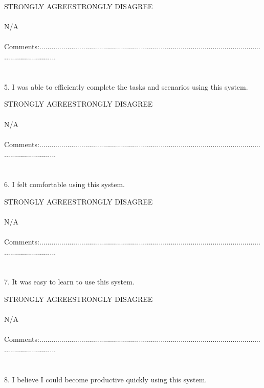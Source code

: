 \begin{appendix}
{STRONGLY AGREE\tab\tab\tab\tab\tab STRONGLY DISAGREE\\
\\
\tab\tab N/A\\
\\
Comments:.........................................................................................................................................\\
\\
\\
5. I was able to efficiently complete the tasks and scenarios using this system.

STRONGLY AGREE\tab\tab\tab\tab\tab STRONGLY DISAGREE\\
\\
\tab\tab N/A\\
\\
Comments:.........................................................................................................................................\\
\\
\\
6. I felt comfortable using this system.

STRONGLY AGREE\tab\tab\tab\tab\tab STRONGLY DISAGREE\\
\\
\tab\tab N/A\\
\\
Comments:.........................................................................................................................................\\
\\
\\
7. It was easy to learn to use this system.

STRONGLY AGREE\tab\tab\tab\tab\tab STRONGLY DISAGREE\\
\\
\tab\tab N/A\\
\\
Comments:.........................................................................................................................................\\
\\
\\
8. I believe I could become productive quickly using this system.

}
\end{appendix}
